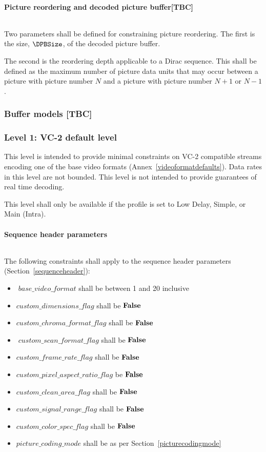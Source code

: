 \paragraph{Picture reordering and decoded picture buffer[TBC]}$\ $\newline
\label{picturereordering}

Two parameters shall be defined for constraining picture reordering.
The first is the size, $\DPBSize$, of the decoded picture buffer.

The second is the reordering depth applicable to a Dirac sequence. This shall
be defined as the maximum number of picture data units that may occur 
between a picture with picture number $N$ and a picture with picture number
$N+1$ or $N-1$.

\subsubsection{Buffer models [TBC]}


\subsubsection{Level 1: VC-2 default level}

This level is intended to provide minimal constraints on VC-2 compatible
streams encoding one of the base video formats 
(Annex~\ref{videoformatdefaults}). Data rates in
this level are not bounded. This level is not intended to provide
guarantees of real time decoding.

This level shall only be available if the profile is set to Low Delay, Simple, or
Main (Intra).

\paragraph{Sequence header parameters}$\ $\newline

The following constraints shall apply to the sequence header parameters
(Section~\ref{sequenceheader}):
\begin{itemize}
\item$base\_video\_format$ shall be between 1 and 20 inclusive
\item $custom\_dimensions\_flag$ shall be $\text{\bf{False}}$
\item $custom\_chroma\_format\_flag$ shall be $\text{\bf{False}}$
\item$custom\_scan\_format\_flag$ shall be $\text{\bf{False}}$
\item $custom\_frame\_rate\_flag$ shall be $\text{\bf{False}}$
\item $custom\_pixel\_aspect\_ratio\_flag$ be $\text{\bf{False}}$
\item $custom\_clean\_area\_flag$ shall be $\text{\bf{False}}$
\item $custom\_signal\_range\_flag$ shall be $\text{\bf{False}}$
\item $custom\_color\_spec\_flag$ shall be $\text{\bf{False}}$
\item $picture\_coding\_mode$ shall be as per Section~\ref{picturecodingmode}
\end{itemize}

